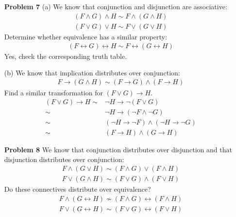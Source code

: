 \begin{enumerate}
\item[\textbf{Problem 7}] 
(a) We know that conjunction and disjunction are associative: 
\begin{gather*}
(F \wedge G) \wedge H \sim F \wedge (G \wedge H) \\
(F \vee G) \vee H \sim F \vee (G \vee H)
\end{gather*}
Determine whether equivalence has a similar property: 
\begin{gather*}
 (F \leftrightarrow G) \leftrightarrow H \sim F \leftrightarrow (G \leftrightarrow H)
\end{gather*}
Yes, check the corresponding truth table. 

(b) We know that implication distributes over conjunction: 
\begin{gather*}
 F \rightarrow (G \wedge H) \sim (F \rightarrow G) \wedge (F \rightarrow H) 
\end{gather*}
Find a similar transformation for $(F \vee G) \rightarrow H$. 
\begin{eqnarray*}
(F \vee G) \rightarrow H 
                         \sim & \neg H \rightarrow \neg(F \vee G) \\
                         \sim & \neg H \rightarrow (\neg F \wedge \neg G) \\
                         \sim & (\neg H \rightarrow \neg F) \wedge (\neg H \rightarrow \neg G) \\  
                         \sim & (F \rightarrow H) \wedge (G \rightarrow H)
\end{eqnarray*}

\item[\textbf{Problem 8}] We know that conjunction distributes over disjunction and that disjunction distributes over conjunction: 
\begin{gather*}
 F \wedge (G \vee H) \sim (F \wedge G) \vee (F \wedge H) \\
 F \vee (G \wedge H) \sim (F \vee G) \wedge (F \vee H)
\end{gather*}
Do these connectives distribute over equivalence?
\begin{eqnarray*}
F \wedge (G \leftrightarrow H) \not \sim (F \wedge G) \leftrightarrow (F \wedge H)  \\
F \vee (G \leftrightarrow H) \sim (F \vee G) \leftrightarrow (F \vee H)
\end{eqnarray*}




\end{enumerate}
